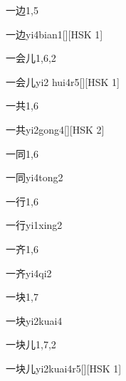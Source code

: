 \begin{entry}{一边}{1,5}
  \begin{phonetics}{一边}{yi4bian1}[][HSK 1]
  \end{phonetics}
\end{entry}

\begin{entry}{一会儿}{1,6,2}
  \begin{phonetics}{一会儿}{yi2 hui4r5}[][HSK 1]
  \end{phonetics}
\end{entry}

\begin{entry}{一共}{1,6}
  \begin{phonetics}{一共}{yi2gong4}[][HSK 2]
  \end{phonetics}
\end{entry}

\begin{entry}{一同}{1,6}
  \begin{phonetics}{一同}{yi4tong2}
  \end{phonetics}
\end{entry}

\begin{entry}{一行}{1,6}
  \begin{phonetics}{一行}{yi1xing2}
  \end{phonetics}
\end{entry}

\begin{entry}{一齐}{1,6}
  \begin{phonetics}{一齐}{yi4qi2}
  \end{phonetics}
\end{entry}

\begin{entry}{一块}{1,7}
  \begin{phonetics}{一块}{yi2kuai4}
  \end{phonetics}
\end{entry}

\begin{entry}{一块儿}{1,7,2}
  \begin{phonetics}{一块儿}{yi2kuai4r5}[][HSK 1]
  \end{phonetics}
\end{entry}

